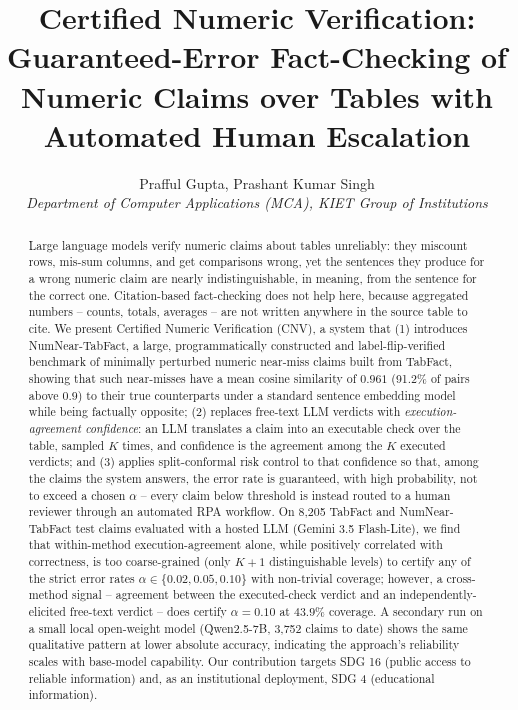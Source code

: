 \documentclass[journal]{IEEEtran}
\begin{document}
\title{Certified Numeric Verification: Guaranteed-Error Fact-Checking of\\ Numeric Claims over Tables with Automated Human Escalation}

\author{Prafful Gupta, Prashant Kumar Singh\\
\textit{Department of Computer Applications (MCA), KIET Group of Institutions}}

\maketitle

\begin{abstract}
Large language models verify numeric claims about tables unreliably: they
miscount rows, mis-sum columns, and get comparisons wrong, yet the sentences
they produce for a wrong numeric claim are nearly indistinguishable, in
meaning, from the sentence for the correct one. Citation-based fact-checking
does not help here, because aggregated numbers -- counts, totals, averages --
are not written anywhere in the source table to cite. We present Certified
Numeric Verification (CNV), a system that (1) introduces
NumNear-TabFact, a large, programmatically constructed and label-flip-verified
benchmark of minimally perturbed numeric near-miss claims built from
TabFact, showing that such near-misses have a mean cosine similarity of
$0.961$ (91.2\% of pairs above $0.9$) to their true counterparts under a
standard sentence embedding model while being factually opposite; (2)
replaces free-text LLM verdicts with \emph{execution-agreement confidence}:
an LLM translates a claim into an executable check over the table, sampled
$K$ times, and confidence is the agreement among the $K$ executed verdicts;
and (3) applies split-conformal risk control to that confidence so that,
among the claims the system answers, the error rate is guaranteed, with high
probability, not to exceed a chosen $\alpha$ -- every claim below threshold
is instead routed to a human reviewer through an automated RPA workflow. On
8{,}205 TabFact and NumNear-TabFact test claims evaluated with a hosted LLM
(Gemini 3.5 Flash-Lite), we find that within-method execution-agreement
alone, while positively correlated with correctness, is too coarse-grained
(only $K{+}1$ distinguishable levels) to certify any of the strict error
rates $\alpha\in\{0.02,0.05,0.10\}$ with non-trivial coverage; however, a
cross-method signal -- agreement between the executed-check verdict and an
independently-elicited free-text verdict -- does certify $\alpha=0.10$ at
$43.9\%$ coverage. A secondary run on a small local open-weight model
(Qwen2.5-7B, 3{,}752 claims to date) shows the same qualitative pattern at
lower absolute accuracy, indicating the approach's reliability scales with
base-model capability. Our contribution targets SDG 16 (public access to
reliable information) and, as an institutional deployment, SDG 4
(educational information).
\end{abstract}
\end{document}

